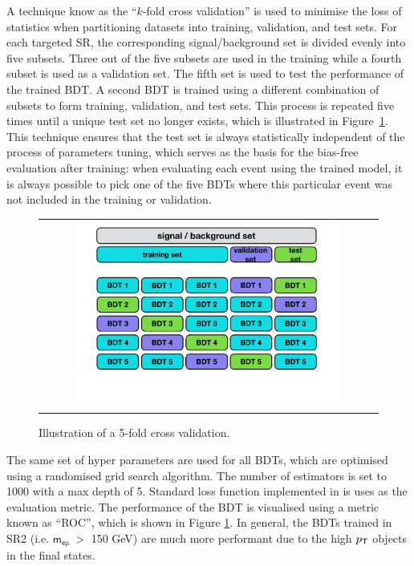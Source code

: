 A technique know as the ``$k$-fold cross validation'' is used to minimise the loss of statistics when partitioning datasets into training, validation, and test sets. For each targeted \ac{SR}, the corresponding signal/background set is divided evenly into five subsets. Three out of the five subsets are used in the training while a fourth subset is used as a validation set. The fifth set is used to test the performance of the trained \ac{BDT}. A second \ac{BDT} is trained using a different combination of subsets to form training, validation, and test sets. This process is repeated five times until a unique test set no longer exists, which is illustrated in Figure~\ref{fig:5fold}. This technique ensures that the test set is always statistically independent of the process of parameters tuning, which serves as the basis for the bias-free evaluation after training: when evaluating each event using the trained model, it is always possible to pick one of the five \acp{BDT} where this particular event was not included in the training or validation.

\begin{figure}[tbh!]
 \begin{center}
   \caption{Illustration of a 5-fold cross validation.}
 \begin{tabular}{c}
  \includegraphics[width=0.8\textwidth]{figures/Part3/BDT/kfold}
 \end{tabular}
 \label{fig:5fold}
 \end{center}
\end{figure}

The same set of hyper parameters are used for all \acp{BDT}, which are optimised using a randomised grid search algorithm. The number of estimators is set to 1000 with a max depth of 5. Standard loss function implemented in \cite{Chen:2016:XST:2939672.2939785} is uses as the evaluation metric. The performance of the \ac{BDT} is visualised using a metric known as ``\ac{ROC}'', which is shown in Figure \ref{fig:5fold}. In general, the \acp{BDT} trained in  \ac{SR}2 (i.e. $\textsf{m}_{\textsf{e}\upmu}~>$ 150 GeV) are much more performant due to the high $p_{\textsf{T}}$ objects in the final states.

